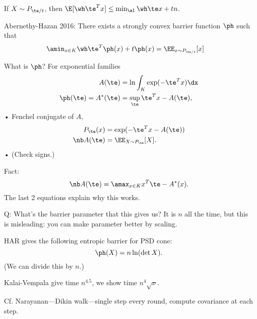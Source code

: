 \begin{thm}
If $X\sim P_{\te/t}$, then $\E[\wh \te^T x]\le \min_\al \wh \te x + tn$.
\end{thm}

Abernethy-Hazan 2016: There exists a strongly convex barrier function $\ph$ such that 
\begin{align}
\amin_{x\in K} \wh\te^T\ph(x) + t\ph(x) &=
\EE_{x\sim P_{\te/t}}[x]
\end{align}


What is $\ph$?
For exponential families
\begin{align}
A(\te) & = \ln \int_K \exp(-\te^T x)\dx\\
\ph(\te) = A^*(\te)&= \sup_\te\te^Tx - A(\te),
\end{align}•
Fenchel conjugate of $A$,
\begin{align}
P_\te(x) &= \exp(-\te^T x - A(\te))\\
\nb A(\te)& = \EE_{X\sim P_\te}[X].
\end{align}•
(Check signs.)

Fact:
$$
\nb A(\te) = \amax_{x\in K} x^T\te - A^*(x).
$$
The last 2 equations explain why this works.

Q: What's the barrier parameter that this gives us? It is $n$ all the time, but this is misleading: you can make parameter better by scaling.

HAR gives the following entropic barrier for PSD cone: 
$$
\ph(X) = n\ln (\det X).
$$
(We can divide this by $n$.)


Kalai-Vempala give time $n^{4.5}$, we show time $n^4\sqrt\nu$.



Cf. Narayanan---Dikin walk---single step every round, compute covariance at each step.

\printbibliography
